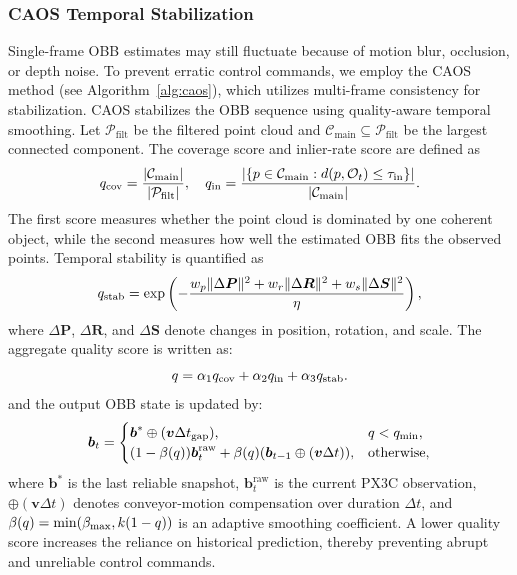 \subsubsection{CAOS Temporal Stabilization}
Single-frame OBB estimates may still fluctuate because of motion blur, occlusion, or depth noise. To prevent erratic control commands, we employ the CAOS method (see Algorithm~\ref{alg:caos}), which utilizes multi-frame consistency for stabilization. CAOS stabilizes the OBB sequence using quality-aware temporal smoothing. Let $\mathcal{P}_{\text{filt}}$ be the filtered point cloud and $\mathcal{C}_{\text{main}}\subseteq\mathcal{P}_{\text{filt}}$ be the largest connected component. The coverage score and inlier-rate score are defined as
\begin{equation}
q_{\text{cov}}=\frac{|\mathcal{C}_{\text{\text{main}}}|}{|\mathcal{P}_{\text{\text{filt}}}|},\quad
q_{\text{in}}=\frac{\left|\{p\in\mathcal{C}_{\text{\text{main}}}:d(p,\mathcal{O}_{t})\le\tau_{\text{\text{in}}}\}\right|}{|\mathcal{C}_{\text{\text{main}}}|}.
\label{eq:qcov}
\end{equation}
The first score measures whether the point cloud is dominated by one coherent object, while the second measures how well the estimated OBB fits the observed points. Temporal stability is quantified as
\begin{equation}
q_{\text{\text{stab}}}=\exp\left(-\frac{w_p\|\Delta\boldsymbol{P}\|^2+w_r\|\Delta\boldsymbol{R}\|^2+w_s\|\Delta\boldsymbol{S}\|^2}{\eta}\right),
\label{eq:qstab}
\end{equation}
where $\Delta\boldsymbol{P}$, $\Delta\boldsymbol{R}$, and $\Delta\boldsymbol{S}$ denote changes in position, rotation, and scale. The aggregate quality score is written as:
\begin{equation}
q=\alpha_1q_{\text{cov}}+\alpha_2q_{\text{\text{in}}}+\alpha_3q_{\text{\text{stab}}}.
\end{equation}
and the output OBB state is updated by:
\begin{equation}
\boldsymbol{b}_{t}=\begin{cases}
\boldsymbol{b}^{*}\oplus(\boldsymbol{v}\Delta t_{\text{gap}}), & q<q_{\text{\text{min}}},\\
(1-\beta(q))\boldsymbol{b}_{t}^{\text{raw}}+\beta(q)(\boldsymbol{b}_{t-1}\oplus(\boldsymbol{v}\Delta t)), & \mathrm{otherwise},
\end{cases}
\label{eq:caos}
\end{equation}
where $\boldsymbol{b}^{*}$ is the last reliable snapshot, $\boldsymbol{b}_{t}^{\text{raw}}$ is the current PX3C observation, $\oplus(\boldsymbol{v}\Delta t)$ denotes conveyor-motion compensation over duration $\Delta t$, and $\beta(q)=\min(\beta_{\text{\text{max}}},k(1-q))$ is an adaptive smoothing coefficient.   A lower quality score increases the reliance on historical prediction, thereby preventing abrupt and unreliable control commands.

